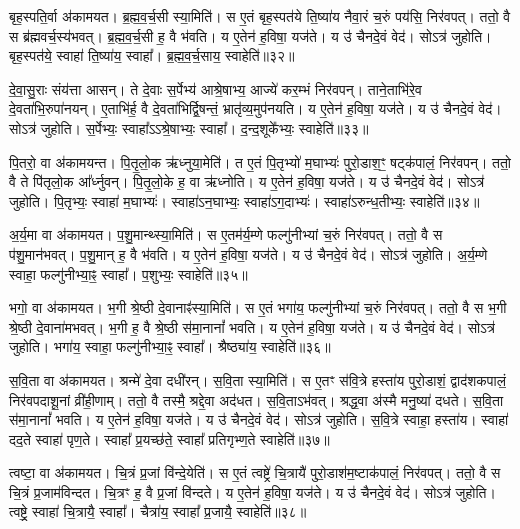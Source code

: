 बृह॒स्पति॒र्वा अ॑कामयत।
ब्र॒ह्म॒व॒र्च॒सी स्या॒मिति॑।
स ए॒तं बृह॒स्पत॑ये ति॒ष्या॑य नैवा॒रं च॒रुं पय॑सि॒ निर॑वपत्।
ततो॒ वै स ब्र॑ह्म\-वर्च॒स्य॑भवत्।
ब्र॒ह्म॒व॒र्च॒सी ह॒ वै भ॑वति।
य ए॒तेन॑ ह॒विषा॒ यज॑ते।
य उ॑ चैनदे॒वं वेद॑।
सोऽत्र॑ जुहोति।
बृह॒स्पत॑ये॒ स्वाहा॑ ति॒ष्या॑य॒ स्वाहा᳚।
ब्र॒ह्म॒व॒र्च॒साय॒ स्वाहेति॑॥३२॥

दे॒वा॒सु॒राः संय॑त्ता आसन्।
ते दे॒वाः स॒र्पेभ्य॑ आश्रे॒षाभ्य॒ आज्ये॑ कर॒म्भं निर॑वपन्।
ताने॒ताभि॑रे॒व दे॒वता॑भि॒रुपा॑नयन्।
ए॒ताभि॑र्ह॒ वै दे॒वता॑भिर्द्वि॒षन्तं॒ भ्रातृ॑व्य॒मुप॑नयति।
य ए॒तेन॑ ह॒विषा॒ यज॑ते।
य उ॑ चैनदे॒वं वेद॑।
सोऽत्र॑ जुहोति।
स॒र्पेभ्यः॒ स्वाहा᳚\-ऽऽश्रे॒षाभ्यः॒ स्वाहा᳚।
द॒न्द॒शूके᳚भ्यः॒ स्वाहेति॑॥३३॥

पि॒तरो॒ वा अ॑कामयन्त।
पि॒तृ॒लो॒क ऋ॑ध्नुया॒मेति॑।
त ए॒तं पि॒तृभ्यो॑ म॒घाभ्यः॑ पुरो॒डाश॒ꣳ॒ षट्क॑पालं॒ निर॑वपन्।
ततो॒ वै ते पि॑तृलो॒क आ᳚र्ध्नुवन्।
पि॒तृ॒लो॒के ह॒ वा ऋ॑ध्नोति।
य ए॒तेन॑ ह॒विषा॒ यज॑ते।
य उ॑ चैनदे॒वं वेद॑।
सोऽत्र॑ जुहोति।
पि॒तृभ्यः॒ स्वाहा॑ म॒घाभ्यः॑।
स्वाहा॑\-ऽन॒घाभ्यः॒ स्वाहा॑ऽग॒दाभ्यः॑।
स्वाहा॑\-ऽरुन्ध॒तीभ्यः॒ स्वाहेति॑॥३४॥

अ॒र्य॒मा वा अ॑कामयत।
प॒शु॒मान्थ्स्या॒मिति॑।
स ए॒तम॑र्य॒म्णे फल्गु॑नीभ्यां च॒रुं निर॑वपत्।
ततो॒ वै स प॑शु॒मान॑भवत्।
प॒शु॒मान् ह॒ वै भ॑वति।
य ए॒तेन॑ ह॒विषा॒ यज॑ते।
य उ॑ चैनदे॒वं वेद॑।
सोऽत्र॑ जुहोति।
अ॒र्य॒म्णे स्वाहा॒ फल्गु॑नीभ्या॒ꣴ॒ स्वाहा᳚।
प॒शुभ्यः॒ स्वाहेति॑॥३५॥

भगो॒ वा अ॑कामयत।
भ॒गी श्रे॒ष्ठी दे॒वानाꣴ॑स्या॒मिति॑।
स ए॒तं भगा॑य॒ फल्गु॑नीभ्यां च॒रुं निर॑वपत्।
ततो॒ वै स भ॒गी श्रे॒ष्ठी दे॒वाना॑मभवत्।
भ॒गी ह॒ वै श्रे॒ष्ठी स॑मा॒नानां᳚ भवति।
य ए॒तेन॑ ह॒विषा॒ यज॑ते।
य उ॑ चैनदे॒वं वेद॑।
सोऽत्र॑ जुहोति।
भगा॑य॒ स्वाहा॒ फल्गु॑नीभ्या॒ꣴ॒ स्वाहा᳚।
श्रैष्ठ्या॑य॒ स्वाहेति॑॥३६॥

स॒वि॒ता वा अ॑कामयत।
श्रन्मे॑ दे॒वा दधी॑रन्।
स॒वि॒ता स्या॒मिति॑।
स ए॒तꣳ स॑वि॒त्रे हस्ता॑य पुरो॒डाशं॒ द्वाद॑शकपालं॒ निर॑वपदाशू॒नां व्री॑ही॒णाम्।
ततो॒ वै तस्मै॒ श्रद्दे॒वा अद॑धत।
स॒वि॒ता\-ऽभ॑वत्।
श्रद्ध॒वा अ॑स्मै मनु॒ष्या॑ दधते।
स॒वि॒ता स॑मा॒नानां᳚ भवति।
य ए॒तेन॑ ह॒विषा॒ यज॑ते।
य उ॑ चैनदे॒वं वेद॑।
सोऽत्र॑ जुहोति।
स॒वि॒त्रे स्वाहा॒ हस्ता॑य।
स्वाहा॑ दद॒ते स्वाहा॑ पृण॒ते।
स्वाहा᳚ प्र॒यच्छ॑ते॒ स्वाहा᳚ प्रतिगृभ्ण॒ते स्वाहेति॑॥३७॥

त्वष्टा॒ वा अ॑कामयत।
चि॒त्रं प्र॒जां वि॑न्दे॒येति॑।
स ए॒तं त्वष्ट्रे॑ चि॒त्रायै॑ पुरो॒डाश॑म॒ष्टा\-क॑पालं॒ निर॑वपत्।
ततो॒ वै स चि॒त्रं प्र॒जाम॑विन्दत।
चि॒त्रꣳ ह॒ वै प्र॒जां वि॑न्दते।
य ए॒तेन॑ ह॒विषा॒ यज॑ते।
य उ॑ चैनदे॒वं वेद॑।
सोऽत्र॑ जुहोति।
त्वष्ट्रे॒ स्वाहा॑ चि॒त्रायै॒ स्वाहा᳚।
चैत्रा॑य॒ स्वाहा᳚ प्र॒जायै॒ स्वाहेति॑॥३८॥

